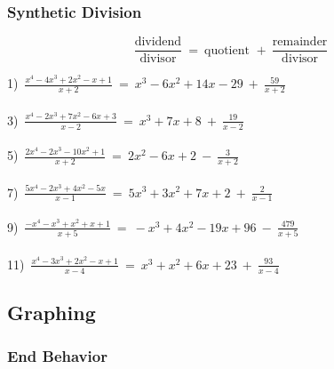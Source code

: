 \documentclass[11pt]{book}
\newcommand{\tmstrong}[1]{\textbf{#1}}
\theoremstyle{definition}  %
\newcommand{\pp}{\par~\par}
\begin{document}
\newpage

\subsubsection{Synthetic Division}
$$\frac{\text{dividend}}{\text{divisor}}~=~\text{quotient~}+~\frac{\text{remainder}}{\text{divisor}}$$

  1)~$\frac{x^4-4x^3+2x^2-x+1 }{x+2}~=~x^3-6x^2+14x-29~ + ~\frac{59}{x+2}$\\
~\\
  3)~$\frac{x^4-2x^3+7x^2-6x+3 }{x-2}~=~x^3+7x+8 ~+~ \frac{19}{x-2}$\\
~\\
  5)~$\frac{2x^4-2x^3-10x^2+1 }{x+2}~=~2x^2-6x+2 ~-~ \frac{3}{x+2}$\\
~\\
  7)~$\frac{5x^4-2x^3+4x^2-5x }{x-1}~=~5x^3+3x^2+7x+2 ~+~ \frac{2}{x-1}$\\
~\\
  9)~$\frac{-x^4-x^3+x^2+x+1 }{x+5}~=~-x^3+4x^2-19x+96 ~-~ \frac{479}{x+5}$\\
~\\
  11)~$\frac{x^4-3x^3+2x^2-x+1 }{x-4}~=~x^3+x^2+6x+23 ~+~ \frac{93}{x-4}$

\newpage

\subsection*{Graphing}
\subsubsection{End Behavior}

\end{document}
